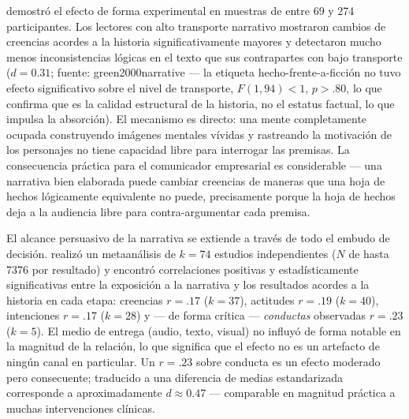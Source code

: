 \textcite{green2000narrative} demostró el efecto de forma experimental en muestras de entre
\num{69} y \num{274} participantes. Los lectores con alto transporte narrativo mostraron cambios
de creencias acordes a la historia significativamente mayores y detectaron mucho menos
inconsistencias lógicas en el texto que sus contrapartes con bajo transporte (\(d = 0.31\); %
fuente: green2000narrative — la etiqueta hecho-frente-a-ficción no tuvo efecto significativo
sobre el nivel de transporte, \(F(1,94) < 1\), \(p > .80\), lo que confirma que es la calidad
estructural de la historia, no el estatus factual, lo que impulsa la absorción). El mecanismo
es directo: una mente completamente ocupada construyendo imágenes mentales vívidas y rastreando
la motivación de los personajes no tiene capacidad libre para interrogar las premisas. La
consecuencia práctica para el comunicador empresarial es considerable — una narrativa bien
elaborada puede cambiar creencias de maneras que una hoja de hechos lógicamente equivalente
no puede, precisamente porque la hoja de hechos deja a la audiencia libre para contra-argumentar
cada premisa.

El alcance persuasivo de la narrativa se extiende a través de todo el embudo de decisión.
\textcite{braddock2016narrative} realizó un metaanálisis de \(k = 74\) estudios independientes
(\(N\) de hasta \num{7376} por resultado) y encontró correlaciones positivas y estadísticamente
significativas entre la exposición a la narrativa y los resultados acordes a la historia en
cada etapa: %
creencias \(r = .17\) (\(k = 37\)), actitudes \(r = .19\) (\(k = 40\)), intenciones
\(r = .17\) (\(k = 28\)) y — de forma crítica — \emph{conductas} observadas \(r = .23\)
(\(k = 5\)). El medio de entrega (audio, texto, visual) no influyó de forma notable en la
magnitud de la relación, lo que significa que el efecto no es un artefacto de ningún canal en
particular. Un \(r = .23\) sobre conducta es un efecto moderado pero consecuente; traducido
a una diferencia de medias estandarizada corresponde a aproximadamente \(d \approx 0.47\) —
comparable en magnitud práctica a muchas intervenciones clínicas.

